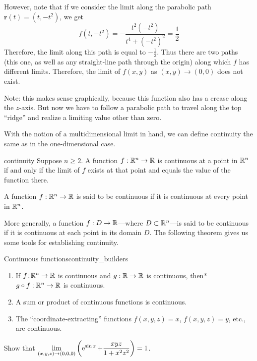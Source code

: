 \documentclass{watsonbook}
\begin{document}
\begin{solution}
  However, note that if we consider the limit along the parabolic
  path $\mathbf{r}(t) = (t, -t^2)$, we get
  \[
    f(t,-t^2) = -\frac{t^2(-t^2)}{t^4+(-t^2)^2} = \frac{1}{2}
  \]
  Therefore, the limit along this path is equal to
  $-\tfrac{1}{2}$. Thus there are two paths (this one, as well as
  any straight-line path through the origin) along which $f$ has
  different limits. Therefore, the limit of $f(x,y)$ as $(x,y) \to
  (0,0)$ does not exist.
  
  Note: this makes sense graphically, because this function also has a
  crease along the $z$-axis. But now we have to follow a
  parabolic path to travel along the top ``ridge'' and realize a
  limiting value other than zero.
\end{solution}

With the notion of a multidimensional limit in hand, we can define
continuity the same as in the one-dimensional case. 

\begin{defn}{}{continuity}
  Suppose $n \geq 2$. A function $f: \mathbb{R}^n \to \mathbb{R}$ is continuous at a
  point in $\mathbb{R}^n$ if and only if the limit of $f$ exists at that point
  and equals the value of the function there.

  A function $f: \mathbb{R}^n \to \mathbb{R}$ is said to be continuous if it is
  continuous at every point in $\mathbb{R}^n$. 
\end{defn}

More generally, a function $f:D \to \mathbb{R}$---where $D \subset \mathbb{R}^n$---is
said to be continuous if it is continuous at each point in its
domain $D$. The following theorem gives us some tools for establishing
continuity. 

\begin{theo}{Continuous functions}{continuity_builders}
  \begin{enumerate}[leftmargin = 12pt]
    \item If $f  \!:\! \mathbb{R}^n \to \mathbb{R}$ is continuous and $g: \mathbb{R} \to \mathbb{R}$
    is continuous, then* $g\circ f :\mathbb{R}^n \to \mathbb{R}$ is
    continuous. 
  \item A sum or product of continuous functions is continuous. 
  \item The ``coordinate-extracting'' functions $f(x,y,z) = x$, $f(x,y,z) = y$, etc., are
    continuous.
  \end{enumerate}
\end{theo}

\begin{example}{}{}
  Show that $\displaystyle{\lim_{(x,y,z) \to (0,0,0)}\left(\operatorname{e}^{\sin x} + \frac{xyz}{1 + x^2
    z^2}\right)} = 1$. 
\end{example}
\end{document}
